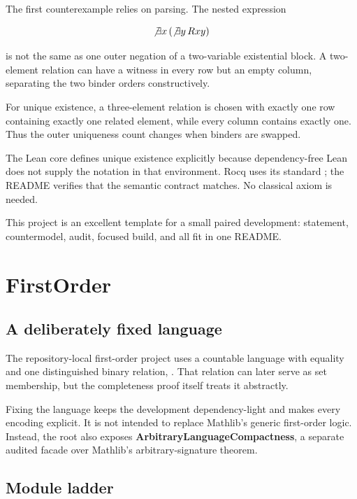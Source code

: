 \documentclass[
  10pt,
  a4paper,
  twoside,
  open=any,
  parskip=half,
  headings=big
]{scrreprt}
\newcommand{\code}[1]{\texttt{\detokenize{#1}}}
\newcommand{\project}[1]{\textsf{\bfseries #1}}
\begin{document}
The first counterexample relies on parsing.  The nested expression

\[
\not\exists x\,(\not\exists y\,Rxy)
\]

is not the same as one outer negation of a two-variable existential block.
A two-element relation can have a witness in every row but an empty column,
separating the two binder orders constructively.

For unique existence, a three-element relation is chosen with exactly one row
containing exactly one related element, while every column contains exactly
one.  Thus the outer uniqueness count changes when binders are swapped.

The Lean core defines unique existence explicitly because dependency-free Lean
does not supply the notation in that environment.  Rocq uses its standard
\code{exists!}; the README verifies that the semantic contract matches.  No
classical axiom is needed.

This project is an excellent template for a small paired development:
statement, countermodel, audit, focused build, and \code{coqchk} all fit in one
README.

\section{FirstOrder}
\label{sec:first-order}

\subsection{A deliberately fixed language}

The repository-local first-order project uses a countable language with
equality and one distinguished binary relation, \code{fMem}.  That relation
can later serve as set membership, but the completeness proof itself treats it
abstractly.

Fixing the language keeps the development dependency-light and makes every
encoding explicit.  It is not intended to replace Mathlib's generic
first-order logic.  Instead, the root also exposes
\project{ArbitraryLanguageCompactness}, a separate audited facade over
Mathlib's arbitrary-signature theorem.

\subsection{Module ladder}
\end{document}
